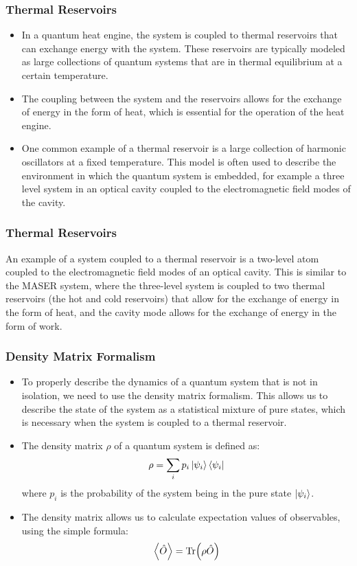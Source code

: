 \documentclass{beamer}
\begin{document}
    \begin{frame}
        \frametitle{Thermal Reservoirs}
        \begin{itemize}
            \item In a quantum heat engine, the system is coupled to thermal reservoirs that can exchange energy with the system. These reservoirs are typically modeled as large collections of quantum systems that are in thermal equilibrium at a certain temperature. \pause
            \item The coupling between the system and the reservoirs allows for the exchange of energy in the form of heat, which is essential for the operation of the heat engine. \pause
            \item One common example of a thermal reservoir is a large collection of harmonic oscillators at a fixed temperature. This model is often used to describe the environment in which the quantum system is embedded, for example a three level system in an optical cavity coupled to the electromagnetic field modes of the cavity. 
        \end{itemize}
    \end{frame}

    \begin{frame}
        \frametitle{Thermal Reservoirs}
        An example of a system coupled to a thermal reservoir is a two-level atom coupled to the electromagnetic field modes of an optical cavity. This is similar to the MASER system, where the three-level system is coupled to two thermal reservoirs (the hot and cold reservoirs) that allow for the exchange of energy in the form of heat, and the cavity mode allows for the exchange of energy in the form of work.

    \end{frame}

    \begin{frame}
        \frametitle{Density Matrix Formalism}
        \begin{itemize}
            \item To properly describe the dynamics of a quantum system that is not in isolation, we need to use the density matrix formalism. This allows us to describe the state of the system as a statistical mixture of pure states, which is necessary when the system is coupled to a thermal reservoir. \pause
            \item The density matrix $\rho$ of a quantum system is defined as:
            \begin{align*}
                \rho = \sum_{i} p_{i} \ket{\psi_{i}}\bra{\psi_{i}}
            \end{align*}
            where $p_{i}$ is the probability of the system being in the pure state $\ket{\psi_{i}}$. \pause
            \item The density matrix allows us to calculate expectation values of observables, using the simple formula:
            \[
                \expval{\hat{O}} = \Tr(\rho \hat{O})
            \]
        \end{itemize}
    \end{frame}
\end{document}
